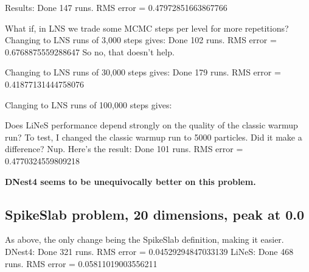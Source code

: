 \documentclass[a4paper, 12pt]{article}
\begin{document}
Results:
Done 147 runs. RMS error = 0.47972851663867766

What if, in LNS we trade some MCMC steps per level
for more repetitions? Changing to LNS runs of
3,000 steps gives:
Done 102 runs. RMS error = 0.6768875559288647
So no, that doesn't help.

Changing to LNS runs of 30,000 steps gives:
Done 179 runs. RMS error = 0.41877131444758076

Clanging to LNS runs of 100,000 steps gives:


Does LiNeS performance depend strongly on the quality of the
classic warmup run? To test, I changed the classic warmup run to 5000
particles. Did it make a difference? Nup. Here's the result:
Done 101 runs. RMS error = 0.4770324559809218



{\bf DNest4 seems to be unequivocally better on this problem.}

\subsection{SpikeSlab problem, 20 dimensions, peak at 0.0}
As above, the only change being the SpikeSlab definition, making it
easier.
DNest4: Done 321 runs. RMS error = 0.04529294847033139
LiNeS: Done 468 runs. RMS error = 0.05811019003556211



\begin{thebibliography}{999}
\end{thebibliography}
\end{document}

